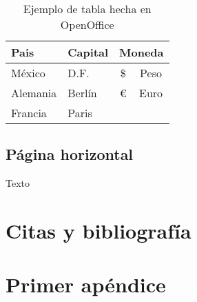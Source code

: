 \documentclass[12pt, a4paper,twoside]{article} %
\begin{document}
\begin{table}[htbp]
\begin{center}
\begin{tabular}{|l|l|c|c|}
\hline
\textbf{Pais} & \textbf{Capital} & \multicolumn{ 2}{c|}{\textbf{Moneda}} \\ \hline
México & D.F. & \$ & Peso \\ \hline
Alemania & Berlín & \multicolumn{ 1}{c|}{€} & \multicolumn{ 1}{c|}{Euro} \\ \cline{ 1- 2}
Francia & Paris & \multicolumn{ 1}{c|}{} & \multicolumn{ 1}{c|}{} \\ \hline
\end{tabular}
\end{center}
\caption{Ejemplo de tabla hecha en OpenOffice}
\label{tab:openoffice}
\end{table}

\begin{landscape}
\section{Página horizontal}
Texto
\end{landscape}

\section{Citas y bibliografía}
\clearpage



\clearpage
\appendix
\addappheadtotoc
\appendixpage
\section{Primer apéndice}
\end{document}
